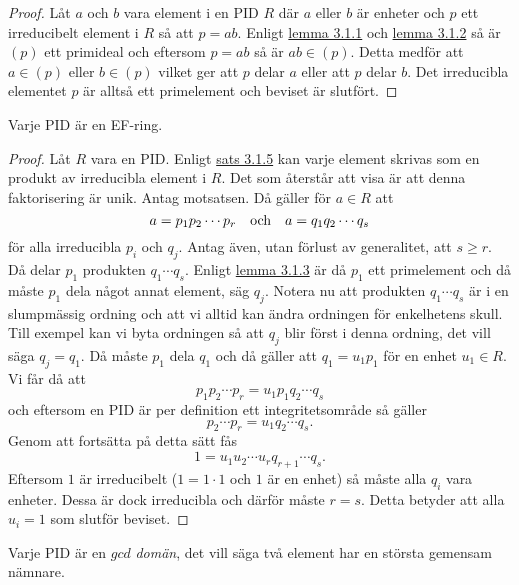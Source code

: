 \documentclass{article}
\theoremstyle{definition}
\begin{document}
\begin{proof}
  Låt $a$ och $b$ vara element i en PID $R$ där $a$ eller $b$ är enheter och $p$ ett irreducibelt element i $R$ så att $p = ab$. Enligt 
  \hyperlink{max}{lemma 3.1.1} och \hyperlink{maxprim}{lemma 3.1.2} så är $(p)$ ett primideal och eftersom $p = ab$ så är $ab \in (p)$.
  Detta medför att $a \in (p)$ eller $b \in (p)$ vilket ger att $p$ delar $a$ eller att $p$ delar $b$. Det irreducibla elementet $p$
  är alltså ett primelement och beviset är slutfört.
\end{proof}

\begin{mytheo}{}{}
  Varje PID är en EF-ring.
\end{mytheo} 

\begin{proof}
  Låt $R$ vara en PID. Enligt \hyperlink{inv}{sats 3.1.5} kan varje element skrivas som en produkt av irreducibla element i $R$. Det som 
  återstår att visa är att denna faktorisering är unik. Antag motsatsen. Då gäller för $a \in R$ att 
  \[ a = p_1p_2 \cdots p_r \quad \textnormal{och} \quad a = q_1q_2 \cdots q_s\]
  för alla irreducibla $p_i$ och $q_j.$ Antag även, utan förlust av generalitet, att $s \geq r.$ Då delar $p_1$ produkten $q_1 \cdots q_s.$
  Enligt \hyperlink{irprim}{lemma 3.1.3} är då $p_1$ ett primelement och då måste $p_1$ dela något annat element, säg $q_j.$
  Notera nu att produkten $q_1 \cdots q_s$ är i en slumpmässig ordning och att vi alltid kan ändra ordningen för enkelhetens skull. 
  Till exempel kan vi byta ordningen 
  så att $q_j$ blir först i denna ordning, det vill säga $q_j = q_1$. 
  Då måste $p_1$ dela $q_1$ och då gäller att $q_1 = u_1p_1$ för en enhet $u_1 \in R.$ Vi får då att 
  \[ p_1p_2 \cdots p_r = u_1p_1q_2 \cdots q_s \]
  och eftersom en PID är per definition ett integritetsområde så gäller 
  \[ p_2 \cdots p_r = u_1 q_2 \cdots q_s. \]
  Genom att fortsätta på detta sätt fås
  \[ 1 = u_1u_2 \cdots u_r q_{r+1} \cdots q_s. \]
  Eftersom $1$ är irreducibelt ($1 = 1 \cdot 1$ och $1$ är en enhet) så måste alla $q_i$ vara enheter. Dessa är dock irreducibla och därför måste 
  $r = s.$ Detta betyder att alla $u_i = 1$ som slutför beviset.
\end{proof}

\begin{mytheo}{}{}
  Varje PID är en $gcd$ \textit{domän}, det vill säga två element har en största gemensam nämnare. 
\end{mytheo}
\end{document}
